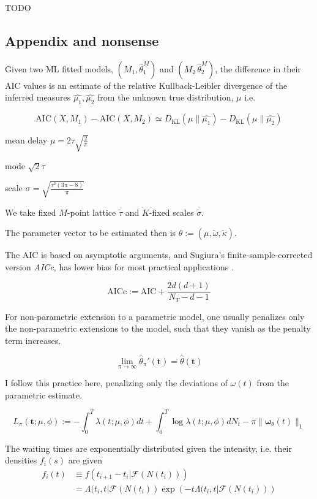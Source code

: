 \documentclass[11pt]{article}
\begin{document}
    TODO

    \subsection{Appendix and nonsense}\label{appendix-and-nonsense}


    Given two ML fitted models, \((M_1,\hat{\theta}^M_1)\) and
\((M_2\,\hat{\theta}^M_2)\), the difference in their AIC values is an
estimate of the relative Kullback-Leibler divergence of the inferred
measures \(\hat{\mu_1},\hat{\mu_2}\) from the unknown true distribution,
\(\mu\) i.e.

\[\mathrm{AIC}(X,M_1)-\mathrm{AIC}(X,M_2) \simeq D_\mathrm{KL}(\mu\|\hat{\mu_1}) - D_\mathrm{KL}(\mu\|\hat{\mu_2})\]

    mean delay \(\mu=2\tau \sqrt{\frac{2}{\pi}}\)

mode \(\sqrt{2}\tau\)

scale \(\sigma=\sqrt{\frac{\tau^2(3 \pi - 8)}{\pi}}\)

We take fixed \(M\)-point lattice \(\tilde{\tau}\) and \(K\)-fixed
scales \(\tilde{\sigma}.\)

The parameter vector to be estimated then is
\(\theta:=(\mu, \tilde{\omega}, \tilde{\kappa}).\)

    The AIC is based on asymptotic arguments, and Sugiura's
finite-sample-corrected version \emph{AICc}, has lower bias for most
practical applications \cite{sugiura_further_1978}.

\[{\mathrm {AICc}}:={\mathrm {AIC}}+{\frac {2d(d+1)}{N_T-d-1}}\]

    For non-parametric extension to a parametric model, one usually
penalizes only the non-parametric extensions to the model, such that
they vanish as the penalty term increases. \cite{green_penalized_1987}

\[\lim_{\pi\to\infty}\hat{\theta}_\pi'(\mathbf t) =\hat{\theta}(\mathbf t)\]

I follow this practice here, penalizing only the deviations of
\(\omega(t)\) from the parametric estimate.

\[L_\pi(\mathbf t;\mu,\phi):=-\int_0^T\lambda(t;\mu,\phi)dt + \int_0^T\log \lambda(t;\mu,\phi) dN_t - \pi\|\boldsymbol \omega_\theta(t)\|_1\]

    The waiting times are exponentially distributed given the intensity,
i.e. their densities \(f_i(s)\) are given \[\begin{aligned}
f_i(t)&\equiv f(t_{i+1}-t_i|\mathcal{F}(N(t_i)))\\
&=\Lambda(t_i,t|\mathcal{F}(N(t_i))\exp\left(-t\Lambda(t_i,t|\mathcal{F}(N(t_i))\right)
\end{aligned}\]
\end{document}
